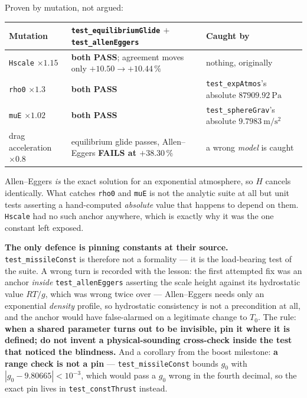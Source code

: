 \documentclass[11pt]{article}
\newcommand{\code}[1]{\texttt{#1}}
\begin{document}
Proven by mutation, not argued:

\begin{center}
\begin{tabular}{p{3.3cm}p{6.5cm}p{4.6cm}}
\toprule
Mutation & \code{test\_equilibriumGlide} $+$ \code{test\_allenEggers} & Caught by \\
\midrule
\code{Hscale} $\times1.15$ & \textbf{both PASS}; agreement moves only $+10.50 \to +10.44\,\%$ & nothing, originally \\
\code{rho0} $\times1.3$    & \textbf{both PASS} & \code{test\_expAtmos}'s absolute $87909.92~\mathrm{Pa}$ \\
\code{muE} $\times1.02$    & \textbf{both PASS} & \code{test\_sphereGrav}'s absolute $9.7983~\mathrm{m/s^2}$ \\
drag acceleration $\times0.8$ & equilibrium glide passes, Allen--Eggers \textbf{FAILS at $+38.30\,\%$} & a wrong \emph{model} is caught \\
\bottomrule
\end{tabular}
\end{center}

Allen--Eggers \emph{is} the exact solution for an exponential atmosphere, so
$H$ cancels identically. What catches \code{rho0} and \code{muE} is not the
analytic suite at all but unit tests asserting a hand-computed
\emph{absolute} value that happens to depend on them. \code{Hscale} had no such
anchor anywhere, which is exactly why it was the one constant left exposed.

\textbf{The only defence is pinning constants at their source.}
\code{test\_missileConst} is therefore not a formality --- it is the
load-bearing test of the suite. A wrong turn is recorded with the lesson: the
first attempted fix was an anchor \emph{inside} \code{test\_allenEggers}
asserting the scale height against its hydrostatic value $RT/g$, which was
wrong twice over --- Allen--Eggers needs only an exponential \emph{density}
profile, so hydrostatic consistency is not a precondition at all, and the
anchor would have false-alarmed on a legitimate change to $T_0$. The rule:
\textbf{when a shared parameter turns out to be invisible, pin it where it is
defined; do not invent a physical-sounding cross-check inside the test that
noticed the blindness.} And a corollary from the boost milestone: \textbf{a
range check is not a pin} --- \code{test\_missileConst} bounds $g_0$ with
$|g_0 - 9.80665| < 10^{-3}$, which would pass a $g_0$ wrong in the fourth
decimal, so the exact pin lives in \code{test\_constThrust} instead.
\end{document}
